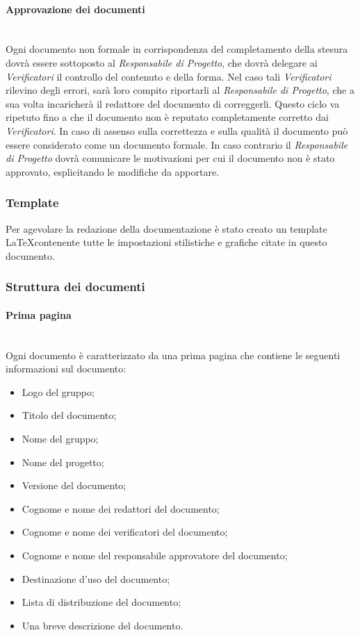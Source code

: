 		\paragraph{Approvazione dei documenti} \mbox{} \\
		Ogni documento non formale in corrispondenza del completamento della stesura dovrà essere sottoposto al \textit{Responsabile di Progetto}, che dovrà delegare ai \textit{Verificatori} il controllo del contenuto e della forma. Nel caso tali \textit{Verificatori} rilevino degli errori, sarà loro compito riportarli al \textit{Responsabile di Progetto}, che a sua volta incaricherà il redattore del documento di correggerli. Questo ciclo va ripetuto fino a che il documento non è reputato completamente corretto dai  \textit{Verificatori}. In caso di assenso sulla correttezza e sulla qualità il documento può essere considerato come un documento formale. In caso contrario il \textit{Responsabile di Progetto} dovrà comunicare le motivazioni per cui il documento non è stato approvato, esplicitando le modifiche da apportare.
		
	\subsubsection{Template}
	Per agevolare la redazione della documentazione è stato creato un template \LaTeX contenente tutte le impostazioni stilistiche e grafiche citate in questo documento.
	
	\subsubsection{Struttura dei documenti}
	
		\paragraph{Prima pagina}\mbox{} \\
		Ogni documento è caratterizzato da una prima pagina che contiene le seguenti informazioni sul documento:
		\begin{itemize}
			\item Logo del gruppo;
			\item Titolo del documento;
			\item Nome del gruppo;
			\item Nome del progetto;
			\item Versione del documento;
			\item Cognome e nome dei redattori del documento;
			\item Cognome e nome dei verificatori del documento;
			\item Cognome e nome del responsabile approvatore del documento;
			\item Destinazione d’uso del documento;
			\item Lista di distribuzione del documento;
			\item Una breve descrizione del documento.
		\end{itemize}
	
